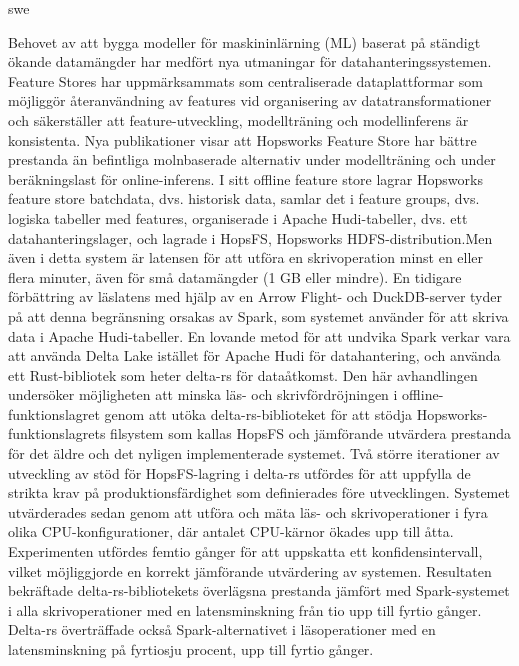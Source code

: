 \markboth{\abstractname}{}
\begin{scontents}[store-env=lang]
swe
\end{scontents}
\begin{scontents}[store-env=abstracts,print-env=true]
Behovet av att bygga modeller för maskininlärning (ML) baserat på ständigt ökande datamängder har medfört nya utmaningar för datahanteringssystemen. Feature Stores har uppmärksammats som centraliserade dataplattformar som möjliggör återanvändning av features vid organisering av datatransformationer och säkerställer att feature-utveckling, modellträning och modellinferens är konsistenta. Nya publikationer visar att Hopsworks Feature Store har bättre prestanda än befintliga molnbaserade alternativ under modellträning och under beräkningslast för online-inferens. I sitt offline feature store lagrar Hopsworks feature store batchdata, dvs. historisk data, samlar det i feature groups, dvs. logiska tabeller med features, organiserade i Apache Hudi-tabeller, dvs. ett datahanteringslager, och lagrade i HopsFS, Hopsworks HDFS-distribution.Men även i detta system är latensen för att utföra en skrivoperation minst en eller flera minuter, även för små datamängder (1 GB eller mindre). En tidigare förbättring av läslatens med hjälp av en Arrow Flight- och DuckDB-server tyder på att denna begränsning orsakas av Spark, som systemet använder för att skriva data i Apache Hudi-tabeller. En lovande metod för att undvika Spark verkar vara att använda Delta Lake istället för Apache Hudi för datahantering, och använda ett Rust-bibliotek som heter delta-rs för dataåtkomst. Den här avhandlingen undersöker möjligheten att minska läs- och skrivfördröjningen i offline-funktionslagret genom att utöka delta-rs-biblioteket för att stödja Hopsworks-funktionslagrets filsystem som kallas HopsFS och jämförande utvärdera prestanda för det äldre och det nyligen implementerade systemet. Två större iterationer av utveckling av stöd för HopsFS-lagring i delta-rs utfördes för att uppfylla de strikta krav på produktionsfärdighet som definierades före utvecklingen. Systemet utvärderades sedan genom att utföra och mäta läs- och skrivoperationer i fyra olika CPU-konfigurationer, där antalet CPU-kärnor ökades upp till åtta. Experimenten utfördes femtio gånger för att uppskatta ett konfidensintervall, vilket möjliggjorde en korrekt jämförande utvärdering av systemen.  Resultaten bekräftade delta-rs-bibliotekets överlägsna prestanda jämfört med Spark-systemet i alla skrivoperationer med en latensminskning från tio upp till fyrtio gånger. Delta-rs överträffade också Spark-alternativet i läsoperationer med en latensminskning på fyrtiosju procent, upp till fyrtio gånger.

\end{scontents}
